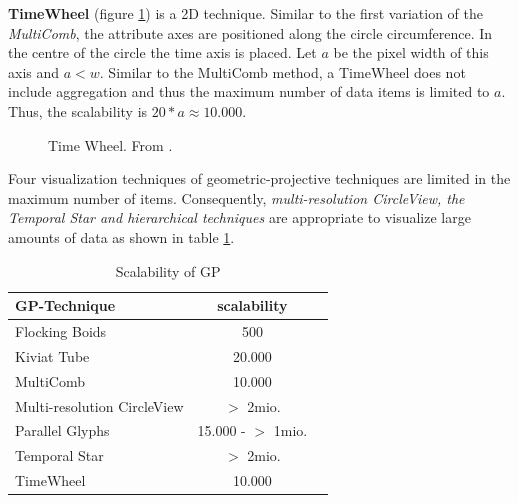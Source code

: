 \textbf{TimeWheel} (figure \ref{fig:timewheel}) is a 2D technique. Similar to the first variation of the \textit{MultiComb}, the attribute axes are positioned along the circle circumference. In the centre of the circle the time axis is placed. Let $a$ be the pixel width of this axis and $a < w$. Similar to the MultiComb method, a TimeWheel does not include aggregation and thus the maximum number of data items is limited to $a$. Thus, the scalability is $20* a \approx 10.000$.
\begin{figure}[H]
    \centering
    \caption[Time Wheel]{Time Wheel. From  \cite{Aigner2011}.}
    \label{fig:timewheel}
\end{figure}\par


Four visualization techniques of geometric-projective techniques are limited in the maximum number of items. Consequently, \textit{multi-resolution CircleView, the Temporal Star and hierarchical techniques} are appropriate to visualize large amounts of data as shown in table \ref{table:GPscalability}. 

\begin{table}[H]
	\centering
	\caption[Scalability of \gls{GP}]{Scalability of \gls{GP}}
	\label{table:GPscalability}
	\begin{tabular}{lcc}
	\hline
	\gls{GP}-Technique & scalability \\
	\hline
	Flocking Boids & \cellcolor{red!25 }500 \\
	Kiviat Tube & \cellcolor{red!25 }20.000 \\
	MultiComb & \cellcolor{red!25 }10.000 \\
	Multi-resolution CircleView & \cellcolor{green!25 }$>$ 2mio.\\
	Parallel Glyphs &  \cellcolor{yellow!25 }15.000 - $>$ 1mio.\\
    Temporal Star &  \cellcolor{green!25 }$>$ 2mio.\\
	TimeWheel & \cellcolor{red!25 }10.000\\
	\hline
	\end{tabular}
\end{table}


